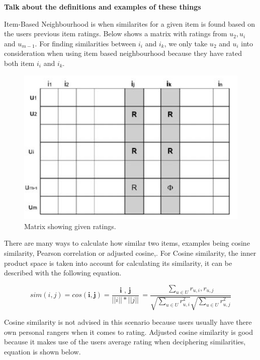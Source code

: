 \textbf{Talk about the definitions and examples of these things \citep{ricci_recommender_2011}}

Item-Based Neighbourhood is when similarites for a given item is found based on the users previous item ratings. Below shows a matrix with ratings from  $u_{2}, u_{i}$ and $u_{m-1}$. For finding similarities between $i_{i}$ and $i_{k}$, we only take $u_{2}$ and  $u_{i}$ into consideration when using item based neighbourhood because they have rated both item $i_{i}$ and $i_{k}$.  

\begin{figure}[H]
	\includegraphics[scale=0.65]{images/neigbourhood_based}
	\centering
	\caption{Matrix showing given ratings. \citep{celma_recommendation_2010}} 
\end{figure}

There are many ways to calculate how similar two items, examples being cosine similarity, Pearson correlation or adjusted cosine,. For Cosine similarity, the inner product space is taken into account for calculating its similarity, it can be described with the following equation.

\begin{equation}
		sim(i , j) = cos( \textbf{i}, \textbf{j} ) = \frac{ \textbf{ i }, \textbf{ j }}{ || i || * || j || } = \frac{ \sum_{ u \in U } r_{ u, i }, r_{ u, j }} { \sqrt{ \sum _{  u \in U } r^{2}_{ u , i}} \sqrt{ \sum _{  u \in U } r^{2}_{ u , j}}}
\end{equation}

Cosine similarity is not advised in this scenario because users usually have there own personal rangers when it comes to rating. Adjusted cosine similarity is good because it makes use of the users average rating when deciphering similarities, equation is shown below.

